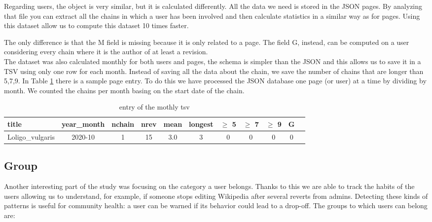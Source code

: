 Regarding users, the object is very similar, but it is calculated differently. All the data we need
is stored in the JSON pages. By analyzing that file you can extract all the chains in which a user
has been involved and then calculate statistics in a similar way as for pages. Using this dataset
allow us to compute this dataset 10 times faster.  

The only difference is that the M field is missing because it is only related to a page. The field G, instead,
can be computed on a user considering every chain where it is the author of at least a revision.\\

The dataset was also calculated monthly for both users and pages, the schema is simpler than the
JSON and this allows us to save it in a TSV using only one row for each month. Instead of saving
all the data about the chain, we save the number of chains that are longer than 5,7,9. In Table
\ref{table:chainsPagemonth} there is a sample page entry. To do this we have processed the
JSON database one page (or user) at a time by dividing by month. We counted the chains per month basing
on the start date of the chain.   

\begin{table}[H]
    \centering
    \begin{tabularx}{\columnwidth}{@{}Xcccccccccc@{}}
        \midrule
        \textbf{title} & \textbf{year\_month} & \textbf{nchain} & \textbf{nrev} & \textbf{mean} & \textbf{longest} & \textbf{$\geq$ 5} & \textbf{$\geq$ 7} & \textbf{$\geq$ 9} & \textbf{G}\\ \toprule
        Loligo\_vulgaris & 2020-10 & 1 & 15 & 3.0 & 3 & 0 & 0 & 0 & 0\\
        
        \bottomrule
    \end{tabularx}
    
    \caption{entry of the mothly tsv \label{table:chainsPagemonth}}
\end{table}


\subsection{Group}
Another interesting part of the study was focusing on the category a user belongs. Thanks to this we
are able to track the habits of the users allowing us to understand, for example, if someone stops
editing Wikipedia after several reverts from admins. Detecting these kinds of patterns is useful for
community health: a user can be warned if its behavior could lead to a drop-off. The groups to which
users can belong are: 


